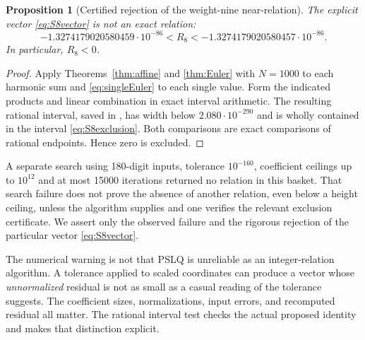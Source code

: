 \documentclass[11pt,letterpaper]{article}
\numberwithin{equation}{section}
\newtheorem{proposition}[theorem]{Proposition}
\theoremstyle{definition}
\begin{document}
\begin{proposition}[Certified rejection of the weight-nine near-relation]
\label{prop:S8false}
The explicit vector \eqref{eq:S8vector} is not an exact relation:
\begin{equation}
 -1.3274179020580459\cdot10^{-86}
 <R_8<
 -1.3274179020580457\cdot10^{-86}.
 \label{eq:S8exclusion}
\end{equation}
In particular, $R_8<0$.
\end{proposition}
\begin{proof}
Apply Theorems~\ref{thm:affine} and \ref{thm:Euler} with $N=1000$ to
each harmonic sum and \eqref{eq:singleEuler} to each single value.
Form the indicated products and linear combination in exact interval
arithmetic. The resulting rational interval, saved in
, has width below
$2.080\cdot10^{-290}$ and is wholly contained in the interval
\eqref{eq:S8exclusion}. Both comparisons are exact comparisons of
rational endpoints. Hence zero is excluded.
\end{proof}

A separate search using 180-digit inputs, tolerance $10^{-160}$,
coefficient ceilings up to $10^{12}$ and at most 15000 iterations
returned no relation in this basket. That search failure does not
prove the absence of another relation, even below a height ceiling,
unless the algorithm supplies and one verifies the relevant exclusion
certificate. We assert only the observed failure and the rigorous
rejection of the particular vector \eqref{eq:S8vector}.

The numerical warning is not that PSLQ \cite{PSLQ} is unreliable as an
integer-relation algorithm. A tolerance applied to scaled coordinates
can produce a vector whose \emph{unnormalized} residual is not as small
as a casual reading of the tolerance suggests. The coefficient sizes,
normalizations, input errors, and recomputed residual all matter. The
rational interval test checks the actual proposed identity and makes
that distinction explicit.
\end{document}
